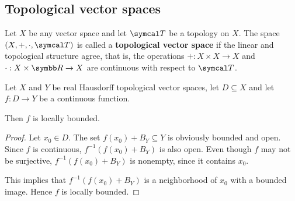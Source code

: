 \subsection{Topological vector spaces}\label{subsec:topological_vector_spaces}

\begin{definition}\label{def:topological_vector_space}
  Let \( X \) be any vector space and let \( \Cal{T} \) be a topology on \( X \). The space \( (X, +, \cdot, \Cal{T}) \) is called a \textbf{topological vector space} if the linear and topological structure agree, that is, the operations \( +: X \times X \to X \) and \( \cdot: X \times \R \to X \) are continuous with respect to \( \Cal{T} \).
\end{definition}

\begin{proposition}\label{thm:continuous_implies_locally_bounded}
  Let \( X \) and \( Y \) be real Hausdorff topological vector spaces, let \( D \subseteq X \) and let \( f: D \to Y \) be a continuous function.

  Then \( f \) is locally bounded.
\end{proposition}
\begin{proof}
  Let \( x_0 \in D \). The set \( f(x_0) + B_Y \subseteq Y \) is obviously bounded and open. Since \( f \) is continuous, \( f^{-1}(f(x_0) + B_Y) \) is also open. Even though \( f \) may not be surjective, \( f^{-1}(f(x_0) + B_Y) \) is nonempty, since it contains \( x_0 \).

  This implies that \( f^{-1}(f(x_0) + B_Y) \) is a neighborhood of \( x_0 \) with a bounded image. Hence \( f \) is locally bounded.
\end{proof}
